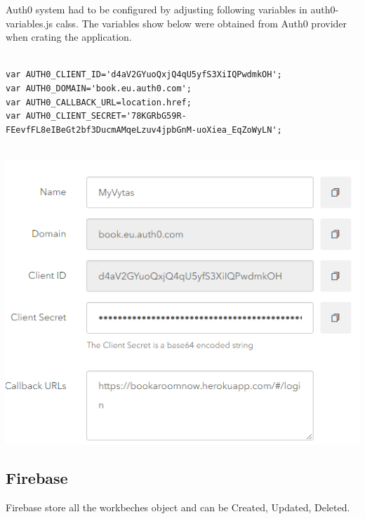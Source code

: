 \bigbreak

Auth0 system had to be configured by adjusting following variables in auth0-variables.js calss. The variables show below were obtained from Auth0 provider when crating the application.

\begin{verbatim}

var AUTH0_CLIENT_ID='d4aV2GYuoQxjQ4qU5yfS3XiIQPwdmkOH';
var AUTH0_DOMAIN='book.eu.auth0.com';
var AUTH0_CALLBACK_URL=location.href;
var AUTH0_CLIENT_SECRET='78KGRbG59R-
FEevfFL8eIBeGt2bf3DucmAMqeLzuv4jpbGnM-uoXiea_EqZoWyLN';


\end{verbatim}
\begin{center}    
	\includegraphics{img/AuthProfile.png}
\end{center}


\pagebreak
\subsection{Firebase}
\bigbreak
Firebase store all the workbeches object and can be Created, Updated, Deleted.

